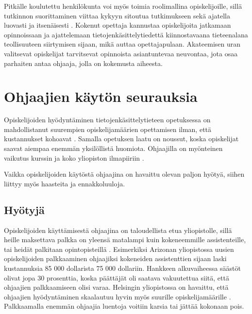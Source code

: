 \documentclass[finnish]{tktltiki2}
\theoremstyle{definition}
\theoremstyle{remark}
\begin{document}
Pitkälle koulutettu henkilökunta voi myös toimia roolimallina opiskelijoille, sillä tutkinnon suorittaminen viittaa kykyyn sitoutua tutkimukseen sekä ajatella luovasti ja itsenäisesti \cite{Baldwin00}. Kokenut opettaja kannustaa opiskelijoita jatkamaan opinnoissaan ja ajattelemaan tietojenkäsittelytiedettä kiinnostavaana tieteenalana teollisuuteen siirtymisen sijaan, mikä auttaa opettajapulaan. Akateemisen uran valitsevat opiskelijat tarvitsevat opinnoista asiantuntevaa neuvontaa, jota osaa parhaiten antaa ohjaaja, jolla on kokemusta aiheesta. \par






\section{Ohjaajien käytön seurauksia}

Opiskelijoiden hyödyntäminen tietojenkäsittelytieteen opetuksessa on mahdollistanut suurempien opiskelijamäärien opettamisen ilman, että kustannukset kohoavat \cite{Reges88}. Samalla opetuksen laatu on noussut, koska opiskelijat saavat aiempaa enemmän yksilöllistä huomiota. Ohjaajilla on myönteinen vaikutus kurssin ja koko yliopiston ilmapiiriin \cite{Dickson11,Roberts95, Tashakkori05}. \par

Vaikka opiskelijoiden käytöstä ohjaajina on havaittu olevan paljon hyötyä, siihen liittyy myös haasteita ja ennakkoluuloja.  \par

\subsection{Hyötyjä}

Opiskelijoiden käyttämisestä ohjaajina on taloudellista etua yliopistolle, sillä heille maksettava palkka on yleensä matalampi kuin kokeneemmille assistenteille, tai heidät palkitaan opintopisteillä \cite{Reges88}. Esimerkiksi Arizonan yliopistossa uusien opiskelijoiden palkkaaminen ohjaajiksi kokeneiden assistenttien sijaan laski kustannuksia 85 000 dollarista 75 000 dollariin. Hankkeen alkuvaiheessa säästöt olivat jopa 30 prosenttia, koska päättäjät oli saatava vakuutettua siitä, että ohjaajien palkkaamiseen olisi varaa. Helsingin yliopistossa on havaittu, että ohjaajien hyödyntäminen skaalautuu hyvin myös suurille opiskelijamäärille \cite{Kurhila11}. Palkkaamalla enemmän ohjaajia luentoja voitiin karsia tai jättää kokonaan pois. \par
\end{document}
